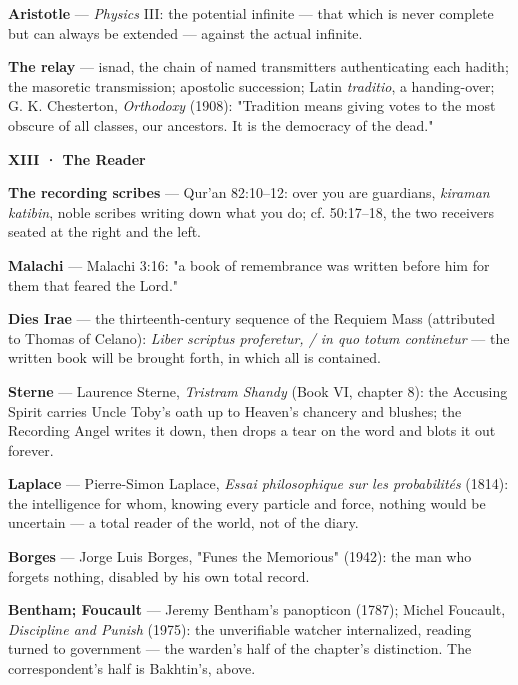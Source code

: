 \documentclass[11pt]{article}
\begin{document}
\textbf{Aristotle} — \emph{Physics} III: the potential infinite — that which is never complete but can always be extended — against the actual infinite.

\textbf{The relay} — isnad, the chain of named transmitters authenticating each hadith; the masoretic transmission; apostolic succession; Latin \emph{traditio}, a handing-over; G. K. Chesterton, \emph{Orthodoxy} (1908): "Tradition means giving votes to the most obscure of all classes, our ancestors. It is the democracy of the dead."

\textbf{XIII · The Reader}

\textbf{The recording scribes} — Qur'an 82:10–12: over you are guardians, \emph{kiraman katibin}, noble scribes writing down what you do; cf. 50:17–18, the two receivers seated at the right and the left.

\textbf{Malachi} — Malachi 3:16: "a book of remembrance was written before him for them that feared the Lord."

\textbf{Dies Irae} — the thirteenth-century sequence of the Requiem Mass (attributed to Thomas of Celano): \emph{Liber scriptus proferetur, / in quo totum continetur} — the written book will be brought forth, in which all is contained.

\textbf{Sterne} — Laurence Sterne, \emph{Tristram Shandy} (Book VI, chapter 8): the Accusing Spirit carries Uncle Toby's oath up to Heaven's chancery and blushes; the Recording Angel writes it down, then drops a tear on the word and blots it out forever.

\textbf{Laplace} — Pierre-Simon Laplace, \emph{Essai philosophique sur les probabilités} (1814): the intelligence for whom, knowing every particle and force, nothing would be uncertain — a total reader of the world, not of the diary.

\textbf{Borges} — Jorge Luis Borges, "Funes the Memorious" (1942): the man who forgets nothing, disabled by his own total record.

\textbf{Bentham; Foucault} — Jeremy Bentham's panopticon (1787); Michel Foucault, \emph{Discipline and Punish} (1975): the unverifiable watcher internalized, reading turned to government — the warden's half of the chapter's distinction. The correspondent's half is Bakhtin's, above.
\end{document}
